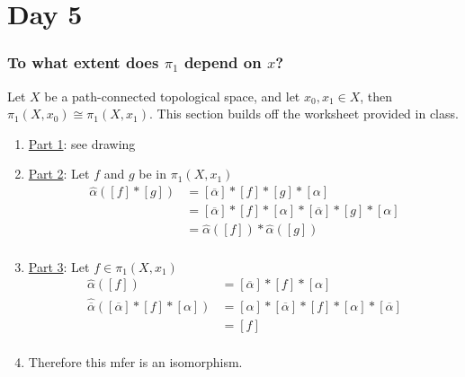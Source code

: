 \section{Day 5}
    \subsubsection{To what extent does $\pi_1$ depend on $x$?}
    \begin{theorem} Let $X$ be a path-connected topological space, and let $x_0,x_1\in X$, then
    $\pi_1(X,x_0)\cong\pi_1(X,x_1)$. This section builds off the worksheet provided in class.
    \begin{enumerate}
        \item \underline{Part 1}: see drawing
        \item \underline{Part 2}: Let $f$ and $g$ be in $\pi_1(X,x_1)$
            \begin{align*}
                \hat{\alpha}([f]*[g])
                &=[\overline{\alpha}] *[f]*[g] *[\alpha]\\
                &=[\overline{\alpha}] *[f] *[\alpha] *[\overline{\alpha}] *[g] *[\alpha]\\
                &=\hat{\alpha}([f])*\hat{\alpha}([g])\\
            \end{align*}
        \item \underline{Part 3}: Let $f \in \pi_1(X,x_1)$
            \begin{align*}
                \hat{\alpha}([f])
                &=[\overline{\alpha}] *[f] *[\alpha]\\
                \hat{\overline{\alpha}}( [\overline{\alpha}] *[f] *[\alpha])
                &=[\alpha] *[\overline{\alpha}] *[f] *[\alpha] *[\overline{\alpha}]\\
                &=[f]\\
            \end{align*}
        \item Therefore this mfer is an isomorphism.
    \end{enumerate}
    \end{theorem}
